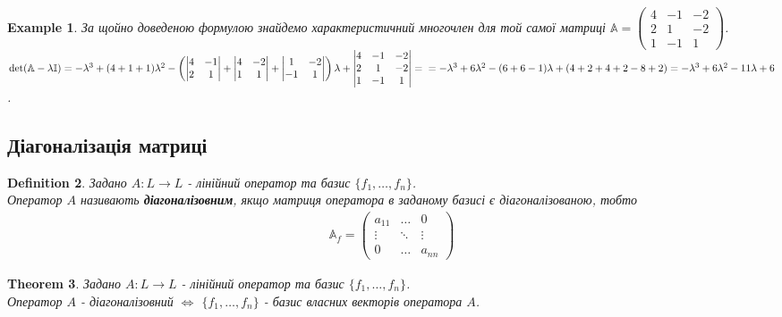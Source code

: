 \documentclass[a4paper, 10pt]{article}
\theoremstyle{theoremdd}
\newtheorem{theorem}{Theorem}[subsection]
\newtheorem{definition}[theorem]{Definition}
\newtheorem{example}[theorem]{Example}
\begin{document}
\begin{example}
За щойно доведеною формулою знайдемо характеристичний многочлен для той самої матриці $\mathbb{A} = \begin{pmatrix}
4 & -1 & -2 \\
2 & 1 & -2 \\
1 & -1 & 1
\end{pmatrix}$.\\
$\det (\mathbb{A} - \lambda \mathbb{I}) = -\lambda^3 + (4+1+1)\lambda^2 - \left( \begin{vmatrix}
4 & -1 \\
2 & 1
\end{vmatrix} + \begin{vmatrix}
4 & -2 \\
1 & 1
\end{vmatrix} + \begin{vmatrix}
1 & -2 \\
-1 & 1
\end{vmatrix} \right) \lambda + \begin{vmatrix}
4 & -1 & -2 \\
2 & 1 & -2 \\
1 & -1 & 1
\end{vmatrix} = \\
=-\lambda^3 + 6\lambda^2 - (6+6-1)\lambda + (4+2+4+2-8+2) = -\lambda^3 + 6\lambda^2 -11\lambda + 6$.
\end{example}

\subsection{Діагоналізація матриці}
\begin{definition}
Задано $A: L \to L$ - лінійний оператор та базис $\{f_1,\dots,f_n\}$.\\
Оператор $A$ називають \textbf{діагоналізовним}, якщо матриця оператора в заданому базисі є діагоналізованою, тобто
\begin{align*}
\mathbb{A}_f = \begin{pmatrix}
a_{11} & \dots & 0 \\
\vdots & \ddots & \vdots \\
0 & \dots & a_{nn}
\end{pmatrix}
\end{align*}
\end{definition}

\begin{theorem}
Задано $A: L \to L$ - лінійний оператор та базис $\{f_1,\dots,f_n\}$.\\
Оператор $A$ - діагоналізовний $\iff$ $\{f_1,\dots,f_n\}$ - базис власних векторів оператора $A$.
\end{theorem}
\end{document}
